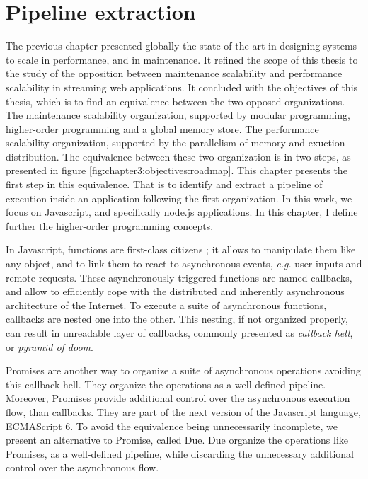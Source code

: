 \chapter{Pipeline extraction} \label{chapter5}

The previous chapter presented globally the state of the art in designing systems to scale in performance, and in maintenance.
It refined the scope of this thesis to the study of the opposition between maintenance scalability and performance scalability in streaming web applications.
It concluded with the objectives of this thesis, which is to find an equivalence between the two opposed organizations.
The maintenance scalability organization, supported by modular programming, higher-order programming and a global memory store.
The performance scalability organization, supported by the parallelism of memory and exuction distribution.
The equivalence between these two organization is in two steps, as presented in figure \ref{fig:chapter3:objectives:roadmap}.
This chapter presents the first step in this equivalence.
That is to identify and extract a pipeline of execution inside an application following the first organization.
In this work, we focus on Javascript, and specifically node.js applications.
In this chapter, I define further the higher-order programming concepts.

In Javascript, functions are first-class citizens ; it allows to manipulate them like any object, and to link them to react to asynchronous events, \textit{e.g.} user inputs and remote requests.
These asynchronously triggered functions are named callbacks, and allow to efficiently cope with the distributed and inherently asynchronous architecture of the Internet.
To execute a suite of asynchronous functions, callbacks are nested one into the other.
This nesting, if not organized properly, can result in unreadable layer of callbacks, commonly presented as \textit{callback hell}, or \textit{pyramid of doom}.

Promises are another way to organize a suite of asynchronous operations avoiding this callback hell.
They organize the operations as a well-defined pipeline.
Moreover, Promises provide additional control over the asynchronous execution flow, than callbacks.
They are part of the next version of the Javascript language, ECMAScript 6.
To avoid the equivalence being unnecessarily incomplete, we present an alternative to Promise, called Due.
Due organize the operations like Promises, as a well-defined pipeline, while discarding the unnecessary additional control over the asynchronous flow.

